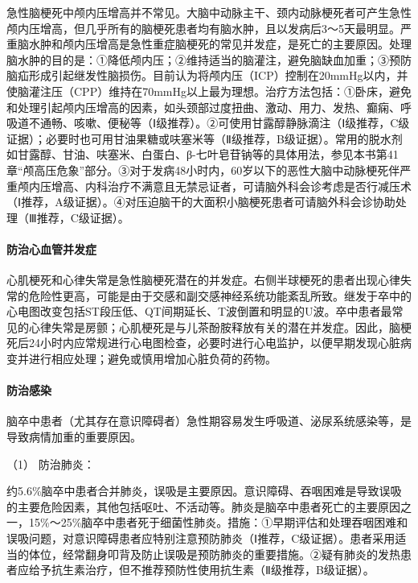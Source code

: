 急性脑梗死中颅内压增高并不常见。大脑中动脉主干、颈内动脉梗死者可产生急性颅内压增高，但几乎所有的脑梗死患者均有脑水肿，且以发病后3～5天最明显。严重脑水肿和颅内压增高是急性重症脑梗死的常见并发症，是死亡的主要原因。处理脑水肿的目的是：①降低颅内压；②维持适当的脑灌注，避免脑缺血加重；③预防脑疝形成引起继发性脑损伤。目前认为将颅内压（ICP）控制在20mmHg以内，并使脑灌注压（CPP）维持在70mmHg以上最为理想。治疗方法包括：①卧床，避免和处理引起颅内压增高的因素，如头颈部过度扭曲、激动、用力、发热、癫痫、呼吸道不通畅、咳嗽、便秘等（Ⅰ级推荐）。②可使用甘露醇静脉滴注（Ⅰ级推荐，C级证据）；必要时也可用甘油果糖或呋塞米等（Ⅱ级推荐，B级证据）。常用的脱水剂如甘露醇、甘油、呋塞米、白蛋白、β-七叶皂苷钠等的具体用法，参见本书第41章“颅高压危象”部分。③对于发病48小时内，60岁以下的恶性大脑中动脉梗死伴严重颅内压增高、内科治疗不满意且无禁忌证者，可请脑外科会诊考虑是否行减压术（Ⅰ推荐，A级证据）。④对压迫脑干的大面积小脑梗死患者可请脑外科会诊协助处理（Ⅲ推荐，C级证据）。

\paragraph{防治心血管并发症}

心肌梗死和心律失常是急性脑梗死潜在的并发症。右侧半球梗死的患者出现心律失常的危险性更高，可能是由于交感和副交感神经系统功能紊乱所致。继发于卒中的心电图改变包括ST段压低、QT间期延长、T波倒置和明显的U波。卒中患者最常见的心律失常是房颤；心肌梗死是与儿茶酚胺释放有关的潜在并发症。因此，脑梗死后24小时内应常规进行心电图检查，必要时进行心电监护，以便早期发现心脏病变并进行相应处理；避免或慎用增加心脏负荷的药物。

\paragraph{防治感染}

脑卒中患者（尤其存在意识障碍者）急性期容易发生呼吸道、泌尿系统感染等，是导致病情加重的重要原因。

\hypertarget{text00242.htmlux5cux23CHP8-1-2-3-3-8-1}{}
（1） 防治肺炎：

约5.6\%脑卒中患者合并肺炎，误吸是主要原因。意识障碍、吞咽困难是导致误吸的主要危险因素，其他包括呕吐、不活动等。肺炎是脑卒中患者死亡的主要原因之一，15\%～25\%脑卒中患者死于细菌性肺炎。措施：①早期评估和处理吞咽困难和误吸问题，对意识障碍患者应特别注意预防肺炎（Ⅰ推荐，C级证据）。患者采用适当的体位，经常翻身叩背及防止误吸是预防肺炎的重要措施。②疑有肺炎的发热患者应给予抗生素治疗，但不推荐预防性使用抗生素（Ⅱ级推荐，B级证据）。

